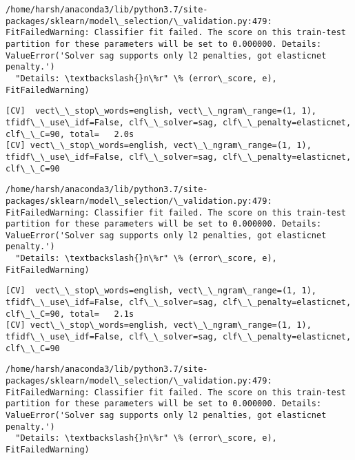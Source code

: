 \documentclass[11pt]{article}
\begin{document}
    \begin{Verbatim}[commandchars=\\\{\}]
/home/harsh/anaconda3/lib/python3.7/site-packages/sklearn/model\_selection/\_validation.py:479: FitFailedWarning: Classifier fit failed. The score on this train-test partition for these parameters will be set to 0.000000. Details: 
ValueError('Solver sag supports only l2 penalties, got elasticnet penalty.')
  "Details: \textbackslash{}n\%r" \% (error\_score, e), FitFailedWarning)

    \end{Verbatim}

    \begin{Verbatim}[commandchars=\\\{\}]
[CV]  vect\_\_stop\_words=english, vect\_\_ngram\_range=(1, 1), tfidf\_\_use\_idf=False, clf\_\_solver=sag, clf\_\_penalty=elasticnet, clf\_\_C=90, total=   2.0s
[CV] vect\_\_stop\_words=english, vect\_\_ngram\_range=(1, 1), tfidf\_\_use\_idf=False, clf\_\_solver=sag, clf\_\_penalty=elasticnet, clf\_\_C=90 

    \end{Verbatim}

    \begin{Verbatim}[commandchars=\\\{\}]
/home/harsh/anaconda3/lib/python3.7/site-packages/sklearn/model\_selection/\_validation.py:479: FitFailedWarning: Classifier fit failed. The score on this train-test partition for these parameters will be set to 0.000000. Details: 
ValueError('Solver sag supports only l2 penalties, got elasticnet penalty.')
  "Details: \textbackslash{}n\%r" \% (error\_score, e), FitFailedWarning)

    \end{Verbatim}

    \begin{Verbatim}[commandchars=\\\{\}]
[CV]  vect\_\_stop\_words=english, vect\_\_ngram\_range=(1, 1), tfidf\_\_use\_idf=False, clf\_\_solver=sag, clf\_\_penalty=elasticnet, clf\_\_C=90, total=   2.1s
[CV] vect\_\_stop\_words=english, vect\_\_ngram\_range=(1, 1), tfidf\_\_use\_idf=False, clf\_\_solver=sag, clf\_\_penalty=elasticnet, clf\_\_C=90 

    \end{Verbatim}

    \begin{Verbatim}[commandchars=\\\{\}]
/home/harsh/anaconda3/lib/python3.7/site-packages/sklearn/model\_selection/\_validation.py:479: FitFailedWarning: Classifier fit failed. The score on this train-test partition for these parameters will be set to 0.000000. Details: 
ValueError('Solver sag supports only l2 penalties, got elasticnet penalty.')
  "Details: \textbackslash{}n\%r" \% (error\_score, e), FitFailedWarning)

    \end{Verbatim}
\end{document}
